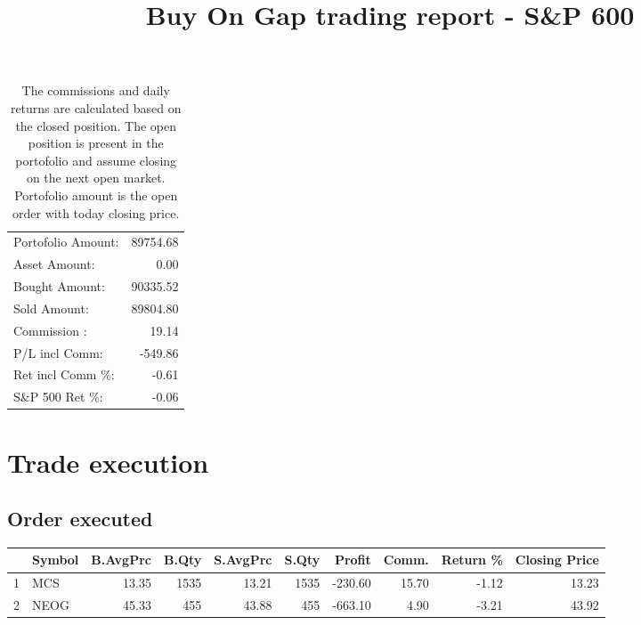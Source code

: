 \documentclass{tufte-handout}\usepackage[]{graphicx}\usepackage[]{color}
\begin{document}
\begin{table}[ht]
\begin{tabular}{lr}
   \hline
Portofolio Amount: & 89754.68 \\ 
  Asset Amount: & 0.00 \\ 
  Bought Amount: & 90335.52 \\ 
  Sold   Amount: & 89804.80 \\ 
  Commission   : & 19.14 \\ 
  P/L incl Comm: & -549.86 \\ 
  Ret incl Comm \%: & -0.61 \\ 
  S\&P 500 Ret \%: & -0.06 \\ 
   \hline
\end{tabular}
\caption{The commissions and daily returns are calculated based on the closed position.
The open position is present in the portofolio and assume closing on the next open market.
Portofolio amount is the open order with today closing price.} 
\end{table}



% 
% 


\title{Buy On Gap trading report - S\&P 600}
\maketitle

\section{Trade execution}
\subsection{Order executed}


\begin{table}[ht]
\centering
\begin{tabular}{llrrrrrrr|r}
  \hline
 & Symbol & B.AvgPrc & B.Qty & S.AvgPrc & S.Qty & Profit & Comm. & Return \% & Closing Price \\ 
  \hline
1 & MCS & 13.35 & 1535 & 13.21 & 1535 & -230.60 & 15.70 & -1.12 & 13.23 \\ 
  2 & NEOG & 45.33 & 455 & 43.88 & 455 & -663.10 & 4.90 & -3.21 & 43.92 \\ 
   \hline
\end{tabular}
\end{table}
\end{document}
